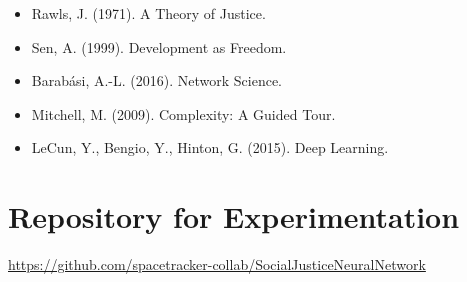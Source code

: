 \documentclass[12pt]{article}
\begin{document}
\begin{itemize}
\item Rawls, J. (1971). A Theory of Justice.
\item Sen, A. (1999). Development as Freedom.
\item Barabási, A.-L. (2016). Network Science.
\item Mitchell, M. (2009). Complexity: A Guided Tour.
\item LeCun, Y., Bengio, Y., Hinton, G. (2015). Deep Learning.
\end{itemize}

\section{Repository for Experimentation}

\noindent
\url{https://github.com/spacetracker-collab/SocialJusticeNeuralNetwork}
\end{document}
